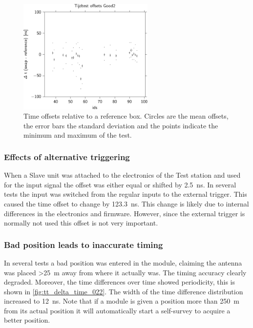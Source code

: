 \begin{figure}
    \centering
    \includegraphics[width=0.6\textwidth]
                    {plots/cluster/hisparc_offsets}
    \caption{Time offsets relative to a reference box. Circles are the
             mean offsets, the error bars the standard deviation and the
             points indicate the minimum and maximum of the test.}
    \label{fig:hisparc_offsets}
\end{figure}


\subsubsection{Effects of alternative triggering}

When a Slave unit was attached to the electronics of the Test station and used for the input signal the offset was either equal or shifted by \SI{2.5}{\ns}. In several tests the input was switched from the regular \pmt inputs to the external trigger. This caused the time offset to change by \SI{123.3}{\ns}. This change is likely due to internal differences in the electronics and firmware. However, since the external trigger is normally not used this offset is not very important.

\subsubsection{Bad position leads to inaccurate timing}

In several tests a bad position was entered in the \gps module, claiming the \gps antenna was placed \SI{>25}{\meter} away from where it actually was. The timing accuracy clearly degraded. Moreover, the time differences over time showed periodicity, this is shown in \cref{fig:tt_delta_time_022}. The width of the time difference distribution increased to \SI{12}{\ns}. Note that if a \gps module is given a position more than \SI{250}{\meter} from its actual position it will automatically start a self-survey to acquire a better position.

